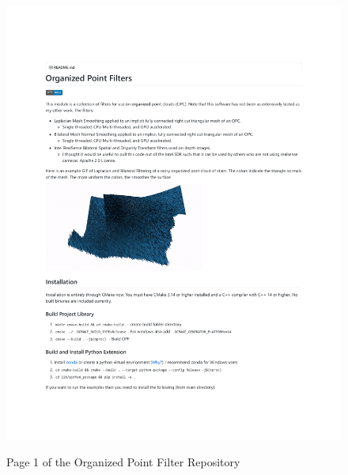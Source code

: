 \begin{figure}[h!]
    \centering\includegraphics[page=1, trim=1.2in 1.2in 1.2in 1.15in, width=.82\linewidth]{appendix_1/imgs/OPFReadme.pdf}
    \label{fig:apx1_opc1}
    \caption{Page 1 of the Organized Point Filter Repository} 
\end{figure}

